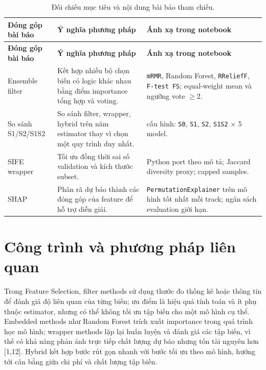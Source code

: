 \begin{small}
\begin{longtable}{
    @{}
    >{\raggedright\arraybackslash}p{}
    >{\raggedright\arraybackslash}p{}
    >{\raggedright\arraybackslash}p{}
    @{}
}
\caption{Đối chiếu mục tiêu và nội dung bài báo tham chiếu.}
\label{tab:01-gioi-thieu-0-i-chi-u-m-c-ti-u-v-n-i-dung-b-i-b-o-tham-chi-u}\\
\toprule
\textbf{Đóng góp bài báo}
&
\textbf{Ý nghĩa phương pháp}
&
\textbf{Ánh xạ trong notebook}
\\
\midrule
\endfirsthead

\toprule
\textbf{Đóng góp bài báo}
&
\textbf{Ý nghĩa phương pháp}
&
\textbf{Ánh xạ trong notebook}
\\
\midrule
\endhead

\midrule
\endfoot

\bottomrule
\endlastfoot

Ensemble filter
&
Kết hợp nhiều bộ chọn biến có logic khác nhau bằng điểm importance tổng hợp và voting.
&
\texttt{mRMR}, Random Forest, \texttt{RReliefF}, \texttt{F-test FS}; equal-weight mean và ngưỡng vote $\geq 2$.
\\

So sánh S1/S2/S1S2
&
So sánh filter, wrapper, hybrid trên năm estimator thay vì chọn một quy trình duy nhất.
&
20 cấu hình: \texttt{S0}, \texttt{S1}, \texttt{S2}, \texttt{S1S2} $\times$ 5 model.
\\

SIFE wrapper
&
Tối ưu đồng thời sai số validation và kích thước subset.
&
Python port theo mô tả; Jaccard diversity proxy; capped samples.
\\

SHAP
&
Phân rã dự báo thành các đóng góp của feature để hỗ trợ diễn giải.
&
\texttt{PermutationExplainer} trên mô hình tốt nhất mỗi track; ngân sách evaluation giới hạn.
\\

\end{longtable}
\end{small}

\section{Công trình và phương pháp liên quan}\label{cuxf4ng-truxecnh-vuxe0-phux1b0ux1a1ng-phuxe1p-liuxean-quan}

Trong Feature Selection, filter methods sử dụng thước đo thống kê hoặc thông tin để đánh giá độ liên quan của từng biến; ưu điểm là hiệu quả tính toán và ít phụ thuộc estimator, nhưng có thể không tối ưu tập biến cho một mô hình cụ thể. Embedded methods như Random Forest trích xuất importance trong quá trình học mô hình; wrapper methods lặp lại huấn luyện và đánh giá các tập biến, vì thế có khả năng phản ánh trực tiếp chất lượng dự báo nhưng tốn tài nguyên hơn [1,12]. Hybrid kết hợp bước rút gọn nhanh với bước tối ưu theo mô hình, hướng tới cân bằng giữa chi phí và chất lượng tập biến.

